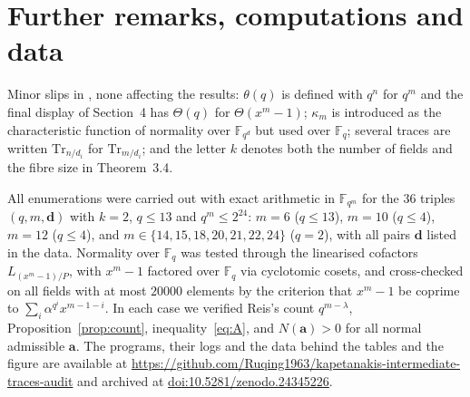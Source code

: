 \documentclass[11pt,a4paper]{amsart}
\theoremstyle{remark}
\newcommand{\F}{\mathbb{F}}
\newcommand{\Fq}{\mathbb{F}_q}
\newcommand{\Tr}{\mathrm{Tr}}
\newcommand{\bd}{\mathbf{d}}
\newcommand{\ba}{\mathbf{a}}
\newcommand{\MKB}{\cite{MKB}}
\begin{document}
\section{Further remarks, computations and data}\label{sec:verif}

Minor slips in \MKB, none affecting the results: $\theta(q)$ is defined with $q^{n}$ for $q^{m}$ and the final
display of Section~4 has $\Theta(q)$ for $\Theta(x^m-1)$; $\kappa_m$ is introduced as the characteristic
function of normality over $\F_{q^{d}}$ but used over $\Fq$; several traces are written $\Tr_{n/d_i}$ for
$\Tr_{m/d_i}$; and the letter $k$ denotes both the number of fields and the fibre size in Theorem~3.4.

All enumerations were carried out with exact arithmetic in $\F_{q^m}$ for the $36$ triples $(q,m,\bd)$ with
$k=2$, $q\le13$ and $q^{m}\le2^{24}$: $m=6$ ($q\le13$), $m=10$ ($q\le4$), $m=12$ ($q\le4$), and
$m\in\{14,15,18,20,21,22,24\}$ ($q=2$), with all pairs $\bd$ listed in the data. Normality over $\Fq$ was
tested through the linearised cofactors $L_{(x^m-1)/P}$, with $x^m-1$ factored over $\Fq$ via cyclotomic
cosets, and cross-checked on all fields with at most $20000$ elements by the criterion that $x^m-1$ be coprime to
$\sum_i\alpha^{q^{i}}x^{m-1-i}$. In each case we verified Reis's count $q^{m-\lambda}$,
Proposition~\ref{prop:count}, inequality~\eqref{eq:A}, and $N(\ba)>0$ for all normal admissible $\ba$. The
programs, their logs and the data behind the tables and the figure are available at
\url{https://github.com/Ruqing1963/kapetanakis-intermediate-traces-audit} and archived at
\href{https://doi.org/10.5281/zenodo.24345226}{doi:10.5281/zenodo.24345226}.
\end{document}
